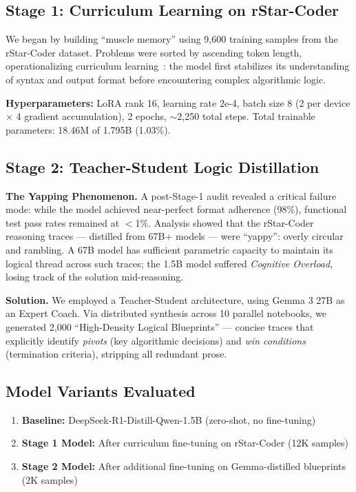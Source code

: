 \documentclass[preprint,12pt]{elsarticle}
\begin{document}
\subsection{Stage 1: Curriculum Learning on rStar-Coder}

We began by building ``muscle memory'' using 9,600 training samples from the rStar-Coder dataset. Problems were sorted by ascending token length, operationalizing curriculum learning~\cite{bengio2009curriculum}: the model first stabilizes its understanding of syntax and output format before encountering complex algorithmic logic.

\textbf{Hyperparameters:} LoRA rank 16, learning rate 2e-4, batch size 8 (2 per device $\times$ 4 gradient accumulation), 2 epochs, $\sim$2,250 total steps. Total trainable parameters: 18.46M of 1.795B (1.03\%).

\subsection{Stage 2: Teacher-Student Logic Distillation}
\label{sec:yapping}

\textbf{The Yapping Phenomenon.} A post-Stage-1 audit revealed a critical failure mode: while the model achieved near-perfect format adherence (98\%), functional test pass rates remained at $<$1\%. Analysis showed that the rStar-Coder reasoning traces — distilled from 67B+ models — were ``yappy'': overly circular and rambling. A 67B model has sufficient parametric capacity to maintain its logical thread across such traces; the 1.5B model suffered \textit{Cognitive Overload}, losing track of the solution mid-reasoning.

\textbf{Solution.} We employed a Teacher-Student architecture, using Gemma 3 27B as an Expert Coach. Via distributed synthesis across 10 parallel notebooks, we generated 2,000 ``High-Density Logical Blueprints'' — concise traces that explicitly identify \textit{pivots} (key algorithmic decisions) and \textit{win conditions} (termination criteria), stripping all redundant prose.

\subsection{Model Variants Evaluated}

\begin{enumerate}
    \item \textbf{Baseline:} DeepSeek-R1-Distill-Qwen-1.5B (zero-shot, no fine-tuning)
    \item \textbf{Stage 1 Model:} After curriculum fine-tuning on rStar-Coder (12K samples)
    \item \textbf{Stage 2 Model:} After additional fine-tuning on Gemma-distilled blueprints (2K samples)
\end{enumerate}
\end{document}
